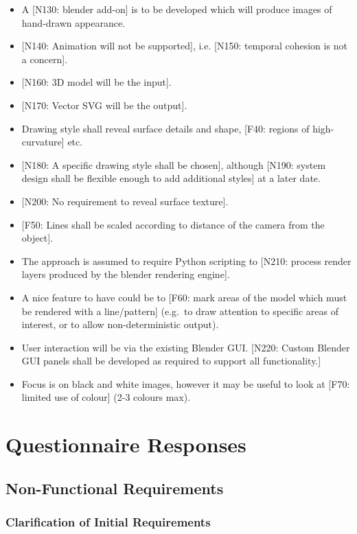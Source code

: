 \begin{itemize}
\tightlist
\item
  A {[}N130: blender add-on{]} is to be developed which will produce
  images of hand-drawn appearance.
\item
  {[}N140: Animation will not be supported{]}, i.e. {[}N150: temporal
  cohesion is not a concern{]}.
\item
  {[}N160: 3D model will be the input{]}.
\item
  {[}N170: Vector SVG will be the output{]}.
\item
  Drawing style shall reveal surface details and shape, {[}F40: regions
  of high-curvature{]} etc.
\item
  {[}N180: A specific drawing style shall be chosen{]}, although
  {[}N190: system design shall be flexible enough to add additional
  styles{]} at a later date.
\item
  {[}N200: No requirement to reveal surface texture{]}.
\item
  {[}F50: Lines shall be scaled according to distance of the camera from
  the object{]}.
\item
  The approach is assumed to require Python scripting to {[}N210:
  process render layers produced by the blender rendering engine{]}.
\item
  A nice feature to have could be to {[}F60: mark areas of the model
  which must be rendered with a line/pattern{]} (e.g.~to draw attention
  to specific areas of interest, or to allow non-deterministic output).
\item
  User interaction will be via the existing Blender GUI. {[}N220: Custom
  Blender GUI panels shall be developed as required to support all
  functionality.{]}
\item
  Focus is on black and white images, however it may be useful to look
  at {[}F70: limited use of colour{]} (2-3 colours max).
\end{itemize}

\section{Questionnaire Responses}\label{questionnaire-responses}

\subsection{Non-Functional Requirements}\label{non-functional-requirements}

\subsubsection{Clarification of Initial Requirements}\label{clarification-of-initial-requirements}

